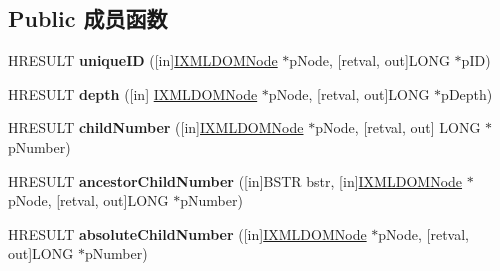 \subsection*{Public 成员函数}
\begin{DoxyCompactItemize}
\item 
\mbox{\label{interface_m_s_x_m_l2_1_1_i_x_t_l_runtime_ad67811db931cf9354bab3571164dfd95}} 
H\+R\+E\+S\+U\+LT {\bfseries unique\+ID} (\mbox{[}in\mbox{]}\hyperlink{interface_m_s_x_m_l2_1_1_i_x_m_l_d_o_m_node}{I\+X\+M\+L\+D\+O\+M\+Node} $\ast$p\+Node, \mbox{[}retval, out\mbox{]}L\+O\+NG $\ast$p\+ID)
\item 
\mbox{\label{interface_m_s_x_m_l2_1_1_i_x_t_l_runtime_a0eb28a3be84fffe585053c34fb771606}} 
H\+R\+E\+S\+U\+LT {\bfseries depth} (\mbox{[}in\mbox{]} \hyperlink{interface_m_s_x_m_l2_1_1_i_x_m_l_d_o_m_node}{I\+X\+M\+L\+D\+O\+M\+Node} $\ast$p\+Node, \mbox{[}retval, out\mbox{]}L\+O\+NG $\ast$p\+Depth)
\item 
\mbox{\label{interface_m_s_x_m_l2_1_1_i_x_t_l_runtime_ac4764c87ce6bcf3d79aef01c098dd714}} 
H\+R\+E\+S\+U\+LT {\bfseries child\+Number} (\mbox{[}in\mbox{]}\hyperlink{interface_m_s_x_m_l2_1_1_i_x_m_l_d_o_m_node}{I\+X\+M\+L\+D\+O\+M\+Node} $\ast$p\+Node, \mbox{[}retval, out\mbox{]} L\+O\+NG $\ast$p\+Number)
\item 
\mbox{\label{interface_m_s_x_m_l2_1_1_i_x_t_l_runtime_ae6428ef5a67a02bd81bc38db2c9f18ed}} 
H\+R\+E\+S\+U\+LT {\bfseries ancestor\+Child\+Number} (\mbox{[}in\mbox{]}B\+S\+TR bstr, \mbox{[}in\mbox{]}\hyperlink{interface_m_s_x_m_l2_1_1_i_x_m_l_d_o_m_node}{I\+X\+M\+L\+D\+O\+M\+Node} $\ast$p\+Node, \mbox{[}retval, out\mbox{]}L\+O\+NG $\ast$p\+Number)
\item 
\mbox{\label{interface_m_s_x_m_l2_1_1_i_x_t_l_runtime_aa482dbe765de42edcb27b39e6f213d88}} 
H\+R\+E\+S\+U\+LT {\bfseries absolute\+Child\+Number} (\mbox{[}in\mbox{]}\hyperlink{interface_m_s_x_m_l2_1_1_i_x_m_l_d_o_m_node}{I\+X\+M\+L\+D\+O\+M\+Node} $\ast$p\+Node, \mbox{[}retval, out\mbox{]}L\+O\+NG $\ast$p\+Number)
\item 
\mbox{\label{interface_m_s_x_m_l2_1_1_i_x_t_l_runtime_abfe3c838af6b50fa8795438a4c3a5a9d}} 

\end{DoxyCompactItemize}
